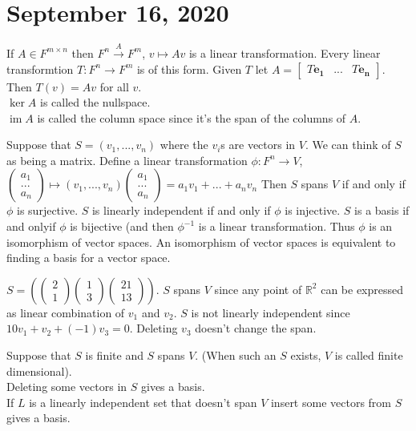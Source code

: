 \documentclass{article}
\newcommand{\R}{\mathbb{R}}
\newcommand{\ra}[1][]{\xrightarrow{#1}}
\DeclareMathOperator{\im}{im}
\begin{document}
\section{September 16, 2020}
\begin{example}
If $A\in F^{m\times n}$ then $F^n\ra[A]F^m$, $v\mapsto Av$ is a linear transformation. Every linear transformtion $T:F^n\ra F^m$ is of this form. Given $T$ let $A=
\begin{bmatrix}
T\mathbf{e_1} & ... & T\mathbf{e_n}
\end{bmatrix}$. 
Then $T(v)=Av$ for all $v$.\\
$\ker A$ is called the nullspace.\\
$\im A$ is called the column space since it's the span of the columns of $A$. 
\end{example}
Suppose that $S=(v_1,...,v_n)$ where the $v_i$s are vectors in $V$. We can think of $S$ as being a matrix. Define a linear transformation $\phi:F^n\ra V$,
$\begin{pmatrix}
a_1\\
...\\
a_n
\end{pmatrix}\mapsto (v_1,...,v_n)
\begin{pmatrix}
a_1\\
...\\
a_n
\end{pmatrix}=a_1v_1+...+a_nv_n$
Then $S$ spans $V$ if and only if $\phi$ is surjective. $S$ is linearly independent if and only if $\phi$ is injective. $S$ is a basis if and onlyif $\phi$ is bijective (and then $\phi^{-1}$ is a linear transformation. Thus $\phi$ is an isomorphism of vector spaces. An isomorphism of vector spaces is equivalent to finding a basis for a vector space.
\begin{example}[$V=\R^2$]
$S=(
\begin{pmatrix}
2\\
1
\end{pmatrix}
\begin{pmatrix}
1\\
3
\end{pmatrix}
\begin{pmatrix}
21\\
13
\end{pmatrix})$. $S$ spans $V$ since any point of $\R^2$ can be expressed as linear combination of $v_1$ and $v_2$. $S$ is not linearly independent since $10v_1+v_2+(-1)v_3=0$. Deleting $v_3$ doesn't change the span. 
\end{example}
\begin{proposition}
Suppose that $S$ is finite and $S$ spans $V$. (When such an $S$ exists, $V$ is called finite dimensional).\\
Deleting some vectors in $S$ gives a basis. \\
If $L$ is a linearly independent set that doesn't span $V$ insert some vectors from $S$ gives a basis. 
\end{proposition}
\end{document}
